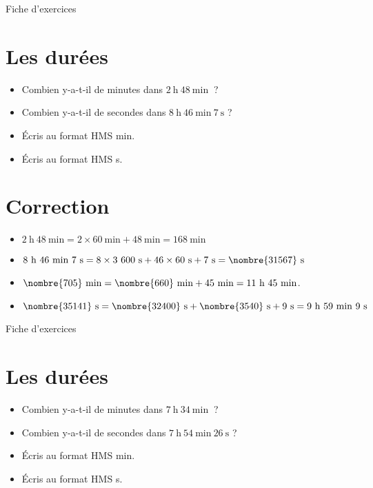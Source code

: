 \documentclass[a4paper,11pt,fleqn]{article}
\begin{document}
\newpage
\setcounter{exo}{0}
\setcounter{section}{0}
\begin{center}
	{\huge Fiche d'exercices } 	
\end{center}


\section{Les durées}
\begin{itemize}
  \item Combien y-a-t-il de minutes dans $2~\text{h}~48~\text{min}~$ ?
  \item Combien y-a-t-il de secondes dans $8~\text{h}~46~\text{min}~7~\text{s}$ ?
  \item Écris au format HMS  min.
  \item Écris au format HMS  s.
\end{itemize}

\section{Correction}
\begin{itemize}
 \item $2~\text{h}~48~\text{min}=2\times60~\text{min}+48~\text{min}=168~\text{min}$
  \item $8~\text{h}~46~\text{min}~7~\text{s}=8\times3~600~\text{s}+46\times60~\text{s}+7~\text{s}=\nombre{31567}~\text{s}$
  \item $\nombre{705}~\text{min}=\nombre{660}~\text{min}+45~\text{min}=11~\text{h}~45~\text{min}$.
  \item $\nombre{35141}~\text{s}=\nombre{32400}~\text{s}+\nombre{3540}~\text{s}+9~\text{s}=9~\text{h}~59~\text{min}~9~\text{s}$ \end{itemize}


\newpage
\setcounter{exo}{0}
\setcounter{section}{0}
\begin{center}
	{\huge Fiche d'exercices } 	
\end{center}


\section{Les durées}
\begin{itemize}
  \item Combien y-a-t-il de minutes dans $7~\text{h}~34~\text{min}~$ ?
  \item Combien y-a-t-il de secondes dans $7~\text{h}~54~\text{min}~26~\text{s}$ ?
  \item Écris au format HMS  min.
  \item Écris au format HMS  s.
\end{itemize}
\end{document}

